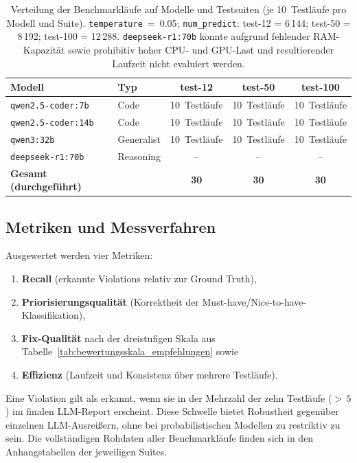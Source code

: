 
\begin{table}[htbp]
\centering
\small
\renewcommand{\arraystretch}{1.15}
\setcounter{benchfnqwen}{\value{footnote}}
\setcounter{benchfndeep}{\value{footnote}}
\begin{tabular}{@{}llccc@{}}
\toprule
\textbf{Modell} & \textbf{Typ} & \textbf{test-12} & \textbf{test-50} & \textbf{test-100} \\
\midrule
\texttt{qwen2.5-coder:7b}  & Code       & 10~Testläufe & 10~Testläufe & 10~Testläufe \\
\texttt{qwen2.5-coder:14b} & Code       & 10~Testläufe & 10~Testläufe & 10~Testläufe \\
\texttt{qwen3:32b}         & Generalist\footnotemark[\value{benchfnqwen}] & 10~Testläufe & 10~Testläufe & 10~Testläufe \\
\texttt{deepseek-r1:70b}   & Reasoning\footnotemark[\value{benchfndeep}]  & --      & --      & --      \\
\midrule
\textbf{Gesamt (durchgeführt)} & & \textbf{30} & \textbf{30} & \textbf{30} \\
\bottomrule
\end{tabular}
\caption[Durchgeführte Benchmarkläufe je Modell und Testsuite]{Verteilung der Benchmarkläufe auf Modelle und Testsuiten (je 10~Testläufe pro Modell und Suite). \texttt{temperature}~=~0.05; \texttt{num\_predict}: test-12 = 6\,144; test-50 = 8\,192; test-100 = 12\,288. \texttt{deepseek-r1:70b} konnte aufgrund fehlender \ac{RAM}-Kapazität sowie prohibitiv hoher \ac{CPU}- und \ac{GPU}-Last und resultierender Laufzeit nicht evaluiert werden.}
\label{tab:benchmark_runs}
\end{table}

\subsection{Metriken und Messverfahren}
\label{sec:versuch_metriken}

Ausgewertet werden vier Metriken:
\begin{enumerate}
  \item \textbf{Recall} (erkannte Violations relativ zur Ground Truth),
  \item \textbf{Priorisierungsqualität} (Korrektheit der Must-have/Nice-to-have-Klassifikation),
  \item \textbf{Fix-Qualität} nach der dreistufigen Skala aus Tabelle~\ref{tab:bewertungsskala_empfehlungen} sowie
  \item \textbf{Effizienz} (Laufzeit und Konsistenz über mehrere Testläufe).
\end{enumerate}
Eine Violation gilt als erkannt, wenn sie in der Mehrzahl der zehn Testläufe ($>\,5$) im finalen \ac{LLM}-Report erscheint. Diese Schwelle bietet Robustheit gegenüber einzelnen \ac{LLM}-Ausreißern, ohne bei probabilistischen Modellen zu restriktiv zu sein. Die vollständigen Rohdaten aller Benchmark\-läufe finden sich in den Anhangstabellen der jeweiligen Suites.

